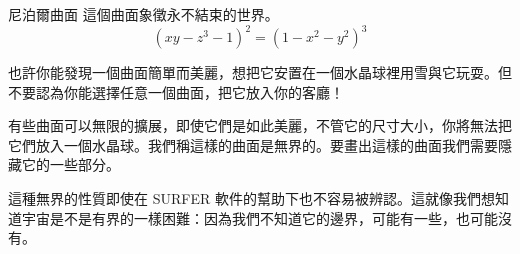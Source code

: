 \begin{surferPage}{尼泊爾曲面}
這個曲面象徵永不結束的世界。\\

\smallskip
\[(x y - z^3 -1)^2= (1 - x^2	- y^2)^3\]

\singlespacing

也許你能發現一個曲面簡單而美麗，想把它安置在一個水晶球裡用雪與它玩耍。但不要認為你能選擇任意一個曲面，把它放入你的客廳！\\

\singlespacing

有些曲面可以無限的擴展，即使它們是如此美麗，不管它的尺寸大小，你將無法把它們放入一個水晶球。我們稱這樣的曲面是無界的。要畫出這樣的曲面我們需要隱藏它的一些部分。\\

\singlespacing

這種無界的性質即使在 SURFER 軟件的幫助下也不容易被辨認。這就像我們想知道宇宙是不是有界的一樣困難：因為我們不知道它的邊界，可能有一些，也可能沒有。
\end{surferPage}

